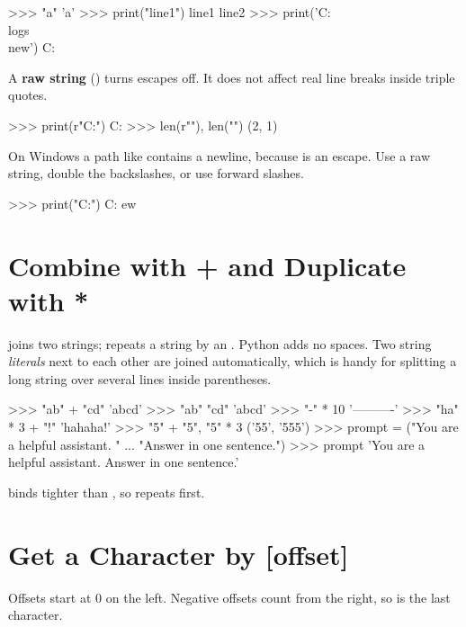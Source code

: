 \begin{pycode}
>>> "a\tb"
'a\tb'
>>> print("line1")
line1
line2
>>> print('C:\\logs\\new')
C:\logs\new
\end{pycode}

A \textbf{raw string} () turns escapes off. It does not affect real line breaks inside triple quotes.

\begin{pycode}
>>> print(r"C:\logs\new")
C:\logs\new
>>> len(r"\n"), len("\n")
(2, 1)
\end{pycode}

\begin{trap}
On Windows a path like  contains a newline, because  is
an escape. Use a raw string, double the backslashes, or use forward slashes.
\begin{pycode}
>>> print("C:\new")
C:
ew
\end{pycode}
\end{trap}

\section{Combine with + and Duplicate with *}

\code{+} joins two strings; \code{*} repeats a string by an . Python adds no spaces.
Two string \emph{literals} next to each other are joined automatically, which is handy for splitting
a long string over several lines inside parentheses.

\begin{pycode}
>>> "ab" + "cd"
'abcd'
>>> "ab" "cd"
'abcd'
>>> "-" * 10
'----------'
>>> "ha" * 3 + "!"
'hahaha!'
>>> "5" + "5", "5" * 3
('55', '555')
>>> prompt = ("You are a helpful assistant. "
...           "Answer in one sentence.")
>>> prompt
'You are a helpful assistant. Answer in one sentence.'
\end{pycode}

\code{*} binds tighter than \code{+}, so  repeats first.

\section{Get a Character by [offset]}

Offsets start at 0 on the left. Negative offsets count from the right, so  is the last character.

